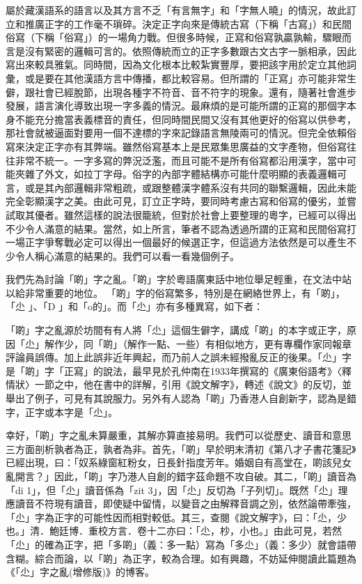 屬於藏漢語系的語言以及其方言不乏「有言無字」和「字無人曉」的情況，故此訂立和推廣正字的工作毫不瑣碎。決定正字向來是傳統古寫（下稱「古寫」）和民間俗寫（下稱「俗寫」）的一場角力戰。但很多時候，正寫和俗寫孰贏孰輸，驟眼而言是沒有緊密的邏輯可言的。依照傳統而立的正字多數跟古文古字一脈相承，因此寫出來較具雅氣。同時間，因為文化根本比較紮實豐厚，要把該字用於定立其他詞彙，或是要在其他漢語方言中傳播，都比較容易。但所謂的「正寫」亦可能非常生僻，跟社會已經脫節，出現各種字不符音、音不符字的現象。還有，隨著社會進步發展，語言演化導致出現一字多義的情況。最麻煩的是可能所謂的正寫的那個字本身不能充分擔當表義標音的責任，但同時間民間又沒有其他更好的俗寫以供參考，那社會就被逼面對要用一個不達標的字來記錄語言無陵兩可的情況。但完全依賴俗寫來決定正字亦有其弊端。雖然俗寫基本上是民眾集思廣益的文字產物，但俗寫往往非常不統一。一字多寫的弊況泛濫，而且可能不是所有俗寫都沿用漢字，當中可能夾雜了外文，如拉丁字母。俗字的內部字體結構亦可能什麼明顯的表義邏輯可言，或是其內部邏輯非常粗疏，或跟整體漢字體系沒有共同的聯繫邏輯，因此未能完全彰顯漢字之美。由此可見，訂立正字時，要同時考慮古寫和俗寫的優劣，並嘗試取其優者。雖然這樣的說法很籠統，但對於社會上要整理的粵字，已經可以得出不少令人滿意的結果。當然，如上所言，筆者不認為透過所謂的正寫和民間俗寫打一場正字爭奪戰必定可以得出一個最好的候選正字，但這過方法依然是可以產生不少令人稱心滿意的結果的。我們可以看一看幾個例子。

我們先為討論「啲」字之亂。「啲」字於粵語廣東話中地位舉足輕重，在文法中站以給非常重要的地位。 「啲」字的俗寫繁多，特別是在網絡世界上，有「啲」，「尐 」、「D 」和「o的」。而「尐」亦有多種異寫，如下者：


「啲」字之亂源於坊間有有人將「尐」這個生僻字，講成「啲」的本字或正字，原因「尐」解作少，同「啲」（解作一點、一些）有相似地方，更有專欄作家同報章評論員誤傳。加上此誤非近年興起，而乃前人之誤未經撥亂反正的後果。「尐」字是「啲」字「正寫」的說法，最早見於孔仲南在1933年撰寫的《廣東俗語考》〈釋情狀〉一節之中，他在書中的詳解，引用《說文解字》，轉述《說文》的反切，並舉出了例子，可見有其說服力。另外有人認為「啲」乃香港人自創新字，認為是錯字，正字或本字是「尐」。

幸好，「啲」字之亂未算嚴重，其解亦算直接易明。我們可以從歷史、讀音和意思三方面剖析孰者為正，孰者為非。首先，「啲」早於明末清初《第八才子書花箋記》已經出現，曰：「奴系綠窗紅粉女，日長針指度芳年。婚姻自有高堂在，啲該兒女亂開言？」因此，「啲」字乃港人自創的錯字茲命題不攻自破。其二，「啲」讀音為「di 1」，但「尐」讀音係為「zit 3」，因「尐」反切為「子列切」。既然「尐」理應讀音不符現有讀音，即使疑中留情，以變音之由解釋音調之別，依然論帶牽強，「尐」字為正字的可能性因而相對較低。其三，查閱《說文解字》，曰：「尐，少也。」清．鮑廷博．重校方言．卷十二亦曰：「尐，杪，小也。」由此可見，若然「尐」的確為正字，把「多啲」（義：多一點）寫為「多尐」（義：多少）就會語帶含糊。綜合而論，以「啲」為正字，較為合理。如有興趣，不妨延伸閱讀此篇題為《「尐」字之亂(增修版)》的博客。

